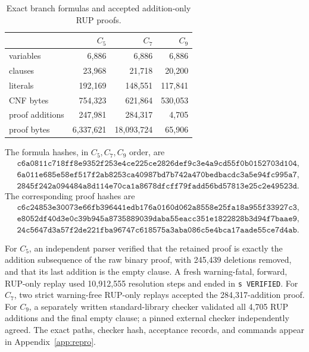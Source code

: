 \documentclass[11pt]{article}
\theoremstyle{definition}
\theoremstyle{remark}
\begin{document}
\begin{table}[ht]
\centering
\small
\caption{Exact branch formulas and accepted addition-only RUP proofs.}
\label{tab:certificates}
\begin{tabular}{@{}lrrr@{}}
\toprule
 & \(C_5\) & \(C_7\) & \(C_9\)\\
\midrule
variables & 6,886 & 6,886 & 6,886\\
clauses & 23,968 & 21,718 & 20,200\\
literals & 192,169 & 148,551 & 117,841\\
CNF bytes & 754,323 & 621,864 & 530,053\\
proof additions & 247,981 & 284,317 & 4,705\\
proof bytes & 6,337,621 & 18,093,724 & 65,906\\
\bottomrule
\end{tabular}
\end{table}

\noindent The formula hashes, in \(C_5,C_7,C_9\) order, are
\begin{align*}
&\texttt{c6a0811c718ff8e9352f253e4ce225ce2826def9c3e4a9cd55f0b0152703d104},\\
&\texttt{6a011e685e58ef517f2ab8253ca40987bd7b742a470bedbacdc3a5e94fc995a7},\\
&\texttt{2845f242a094484a8d114e70ca1a8678dfcff79fadd56bd57813e25c2e49523d}.
\end{align*}
The corresponding proof hashes are
\begin{align*}
&\texttt{c6c24853e30073e66fb396441edb176a0160d062a8558e25fa18a955f33927c3},\\
&\texttt{e8052df40d3e0c39b945a8735889039daba55eacc351e1822828b3d94f7baae9},\\
&\texttt{24c5647d3a57f2de221fba96747c618575a3aba086c5e4bca17aade55ce7d4ab}.
\end{align*}

For \(C_5\), an independent parser verified that the retained proof is
exactly the addition subsequence of the raw binary proof, with 245,439
deletions removed, and that its last addition is the empty clause.  A fresh
warning-fatal, forward, RUP-only replay used 10,912,555 resolution steps and
ended in \texttt{s VERIFIED}.  For \(C_7\), two strict warning-free RUP-only
replays accepted the 284,317-addition proof.  For \(C_9\), a separately
written standard-library checker validated all 4,705 RUP additions and the
final empty clause; a pinned external checker independently agreed.
The exact paths, checker hash, acceptance records, and commands appear in
Appendix~\ref{app:repro}.
\end{document}
